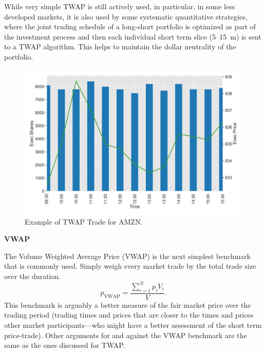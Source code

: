While very simple TWAP is still actively used, in particular, in some less developed markets, it is also used by some systematic quantitative strategies, where the joint trading schedule of a long-short portfolio is optimized as part of the investment process and then each individual short term slice (5--15~m) is sent to a TWAP algorithm. This helps to maintain the dollar neutrality of the portfolio. \twomedskip

        \begin{figure}[!ht]
        \centering
        \includegraphics[width=\textwidth]{chapters/chapter_exec_models/figures/twap.png} 
        \caption{Example of TWAP Trade for AMZN.\label{fig:twap_amzn}}
        \end{figure} \twomedskip



\pagebreak



\noindent\textbf{VWAP} \label{in:vwap} \twomedskip


The Volume Weighted Average Price (VWAP) is the next simplest benchmark that is commonly used. Simply weigh every market trade by the total trade size over the duration.
        \begin{equation} \label{eq:vwapstet}
        p_\text{VWAP}= \dfrac{ \sum_{i=1}^N p_i V_i}{V}.
        \end{equation}
This benchmark  is arguably a better measure of the fair market price over the trading period (trading times and prices that are closer to the times and prices other market participants---who might have a better assessment of the short term price-trade). Other arguments for and against the VWAP benchmark are the same as the ones discussed for TWAP. 



